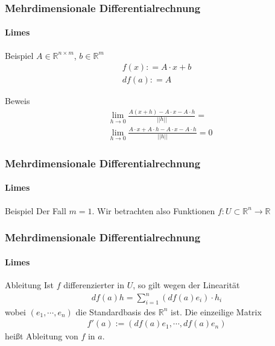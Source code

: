 \documentclass{beamer}
\begin{document}
\begin{frame}
    \frametitle{Mehrdimensionale Differentialrechnung}
\framesubtitle{Limes}
    \begin{block}{Beispiel}
$A \in \mathbb{R}^{n \times m}$, $b \in \mathbb{R}^m$ 
\begin{align}
f(x) : = A\cdot x + b \\
df(a) : = A 
\end{align}
\end{block}
    \begin{block}{Beweis}
\begin{align}
& \lim_{h\to 0} \frac{A(x + h) - A\cdot x -A\cdot h}{||h||} = \\
& \lim_{h\to 0} \frac{A\cdot x + A \cdot h - A\cdot x -A\cdot h}{||h||} = 0
\end{align}
\end{block}

 \end{frame}


\begin{frame}
    \frametitle{Mehrdimensionale Differentialrechnung}
\framesubtitle{Limes}
    \begin{block}{Beispiel}
Der Fall $m=1$. Wir betrachten also Funktionen $f : U \subset \mathbb{R}^n \to \mathbb{R}$
\end{block}
 
 \end{frame}



\begin{frame}
    \frametitle{Mehrdimensionale Differentialrechnung}
\framesubtitle{Limes}
    \begin{block}{Ableitung}
Ist $f$ differenzierter in $U$, so gilt wegen der Linearität 
\begin{align}
df(a)h = \sum_{i= 1}^n (df(a)e_i)\cdot h_i
\end{align}
wobei $(e_1, \cdots, e_n)$ die Standardbasis des $\mathbb{R}^n$ ist.
Die einzeilige Matrix
\begin{align}
f'(a) := (df(a) e_1, \cdots ,  df(a) e_n)
\end{align}
heißt Ableitung von $f$ in $a$.
\end{block}

 \end{frame}
\end{document}
